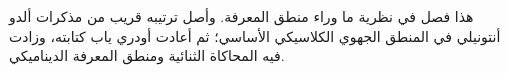 \documentclass[../../../include/open-logic-chapter]{subfiles}
\begin{document}

\begin{editorial}
  هذا فصل في نظرية ما وراء منطق المعرفة. وأصل ترتيبه قريب من مذكرات ألدو
  أنتونيلي في المنطق الجهوي الكلاسيكي الأساسي؛ ثم أعادت أودري ياب كتابته،
  وزادت فيه المحاكاة الثنائية ومنطق المعرفة الديناميكي.
\end{editorial}



\OLEndChapterHook
\end{document}
